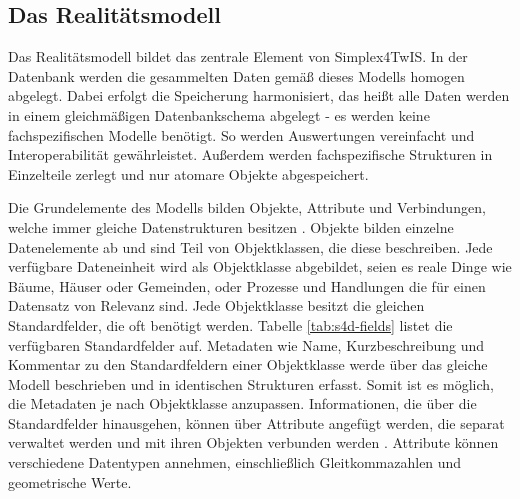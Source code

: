 \subsection{Das Realitätsmodell}
\label{sec:simplex-reality}

Das Realitätsmodell bildet das zentrale Element von Simplex4TwIS. In der Datenbank werden die gesammelten Daten gemäß dieses Modells homogen abgelegt. Dabei erfolgt die Speicherung harmonisiert, das heißt alle Daten werden in einem gleichmäßigen Datenbankschema abgelegt - es werden keine fachspezifischen Modelle benötigt. So werden Auswertungen vereinfacht und Interoperabilität gewährleistet. Außerdem werden fachspezifische Strukturen in Einzelteile zerlegt und nur atomare Objekte abgespeichert.

Die Grundelemente des Modells bilden Objekte, Attribute und Verbindungen, welche immer gleiche Datenstrukturen besitzen \parencite{grossmannFachsystemeSchemaevolution2024}. Objekte bilden einzelne Datenelemente ab und sind Teil von Objektklassen, die diese beschreiben. Jede verfügbare Dateneinheit wird als Objektklasse abgebildet, seien es reale Dinge wie Bäume, Häuser oder Gemeinden, oder Prozesse und Handlungen die für einen Datensatz von Relevanz sind. Jede Objektklasse besitzt die gleichen Standardfelder, die oft benötigt werden. Tabelle \ref{tab:s4d-fields} listet die verfügbaren Standardfelder auf. Metadaten wie Name, Kurzbeschreibung und Kommentar zu den Standardfeldern einer Objektklasse werde über das gleiche Modell beschrieben und in identischen Strukturen erfasst. Somit ist es möglich, die Metadaten je nach Objektklasse anzupassen. Informationen, die über die Standardfelder hinausgehen, können über Attribute angefügt werden, die separat verwaltet werden und mit ihren Objekten verbunden werden \parencite{grossmannFachsystemeSchemaevolution2024}. Attribute können verschiedene Datentypen annehmen, einschließlich Gleitkommazahlen und geometrische Werte.


